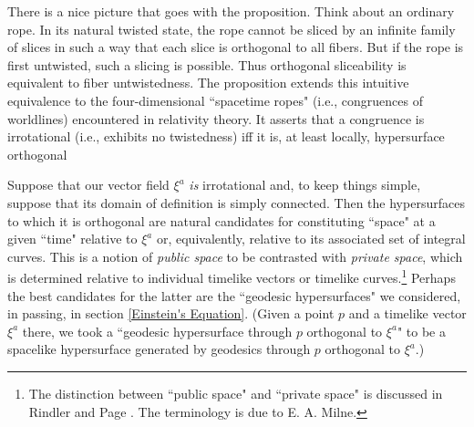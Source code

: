 \documentclass [12] {article}
\theoremstyle{plain}
\numberwithin{figure}{subsection}
\numberwithin{proposition}{subsection}
\begin{document}
There is a nice picture that goes with the proposition. Think about an ordinary rope. In its natural twisted state, the rope cannot be sliced by an infinite family of slices in such a way that each  slice is orthogonal to all fibers. But if the rope is first untwisted, such a slicing is possible. Thus orthogonal sliceability is equivalent to fiber untwistedness. The proposition extends this intuitive equivalence to the four-dimensional ``spacetime ropes" (i.e., congruences of worldlines) encountered in relativity theory. It asserts that a congruence is irrotational (i.e., exhibits no twistedness) iff  it is, at least locally,  hypersurface orthogonal 

Suppose that our vector field $\xi^a$ \emph{is} irrotational and, to keep things simple,  suppose that its domain of definition is  simply connected. Then the hypersurfaces to which it is orthogonal are natural candidates for constituting ``space" at a given ``time"  relative to $\xi^a$ or, equivalently, relative to its associated set of integral curves.  This is a notion of \emph{public space} to be contrasted with \emph{private space},  which is determined relative to individual  timelike vectors or timelike curves.\footnote{The distinction between ``public space" and ``private space" is discussed in Rindler  and Page . The terminology is due to E. A. Milne.}  Perhaps the best candidates for the latter are the ``geodesic hypersurfaces" we considered, in passing, in section \ref{Einstein's Equation}. (Given a point $p$ and a timelike vector $\xi^a$ there, we took a ``geodesic hypersurface through $p$ orthogonal to $\xi^a$" to be a spacelike hypersurface generated by geodesics through $p$ orthogonal  to $\xi^a$.)  
\end{document}
